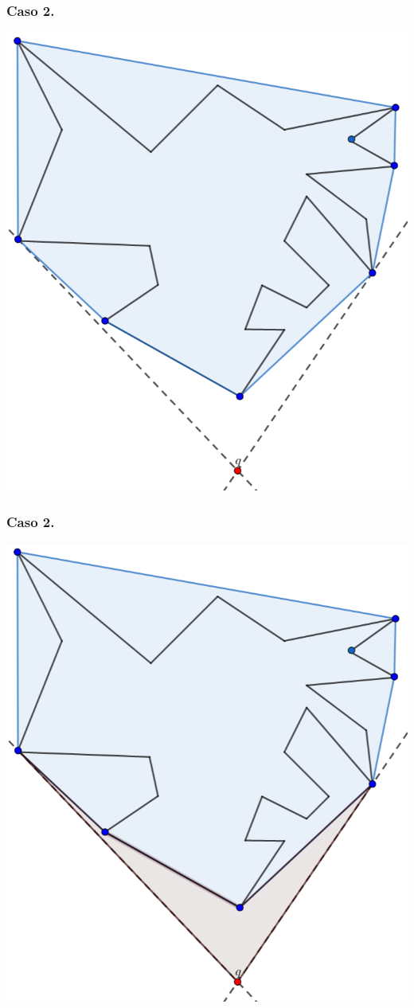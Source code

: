 \begin{frame}
  \frametitle{Caso 2.}
  \centering \includegraphics[width=0.45 \paperwidth]{images/CasosQExterno/P03F.png}
\end{frame}

\begin{frame}
  \frametitle{Caso 2.}
  \centering \includegraphics[width=0.45 \paperwidth]{images/CasosQExterno/P04F.png}
\end{frame}


